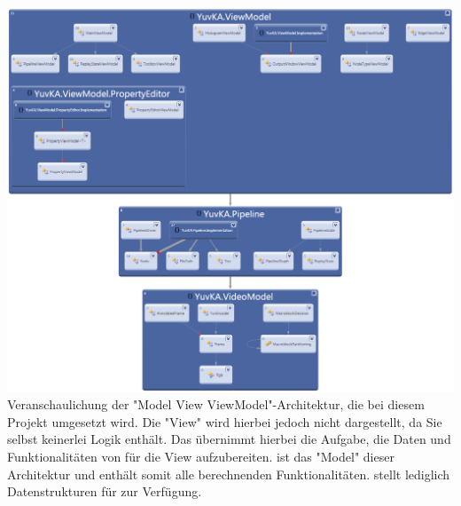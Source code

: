 \includegraphics[width=\textwidth]{Diagrams/namespacedependencies.png}
Veranschaulichung der "Model View ViewModel"-Architektur, die bei diesem Projekt umgesetzt wird. Die "View" wird hierbei jedoch nicht dargestellt, da Sie selbst keinerlei Logik enthält. Das  übernimmt hierbei die Aufgabe, die Daten und Funktionalitäten von  für die View aufzubereiten.  ist das "Model" dieser Architektur und enthält somit alle berechnenden Funktionalitäten.  stellt lediglich Datenstrukturen für  zur Verfügung.